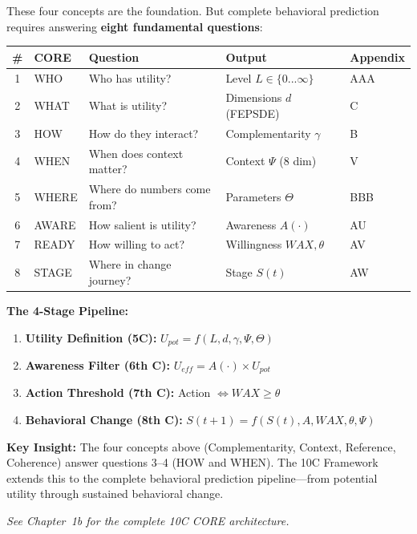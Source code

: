 \begin{tcolorbox}[colback=blue!5!white, colframe=blue!75!black,
    title=\textbf{The 10C CORE Framework}]

These four concepts are the foundation. But complete behavioral prediction
requires answering \textbf{eight fundamental questions}:

\begin{center}
\small
\begin{tabular}{@{}cllll@{}}
\toprule
\textbf{\#} & \textbf{CORE} & \textbf{Question} & \textbf{Output} & \textbf{Appendix} \\
\midrule
1 & WHO & Who has utility? & Level $L \in \{0...\infty\}$ & AAA \\
2 & WHAT & What is utility? & Dimensions $d$ (FEPSDE) & C \\
3 & HOW & How do they interact? & Complementarity $\gamma$ & B \\
4 & WHEN & When does context matter? & Context $\Psi$ (8 dim) & V \\
5 & WHERE & Where do numbers come from? & Parameters $\Theta$ & BBB \\
6 & AWARE & How salient is utility? & Awareness $A(\cdot)$ & AU \\
7 & READY & How willing to act? & Willingness $WAX, \theta$ & AV \\
8 & STAGE & Where in change journey? & Stage $S(t)$ & AW \\
\bottomrule
\end{tabular}
\end{center}

\textbf{The 4-Stage Pipeline:}
\begin{enumerate}[nosep]
    \item \textbf{Utility Definition (5C):} $U_{pot} = f(L, d, \gamma, \Psi, \Theta)$
    \item \textbf{Awareness Filter (6th C):} $U_{eff} = A(\cdot) \times U_{pot}$
    \item \textbf{Action Threshold (7th C):} Action $\Leftrightarrow WAX \geq \theta$
    \item \textbf{Behavioral Change (8th C):} $S(t+1) = f(S(t), A, WAX, \theta, \Psi)$
\end{enumerate}

\textbf{Key Insight:} The four concepts above (Complementarity, Context, Reference, Coherence) answer questions 3--4 (HOW and WHEN). The 10C Framework extends this to the complete behavioral prediction pipeline---from potential utility through sustained behavioral change.

\textit{See Chapter~1b for the complete 10C CORE architecture.}

\end{tcolorbox}

